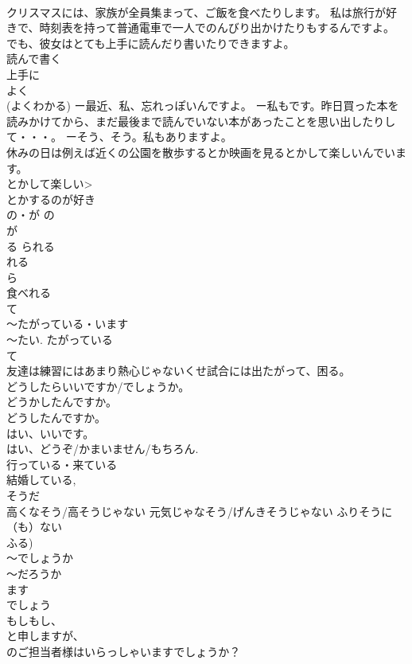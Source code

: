 \documentclass[8pt]{extreport}
\begin{document}
\begin{CJK}{UTF8}{min}
\\	クリスマスには、家族が全員集まって、ご飯を食べたりします。 私は旅行が好きで、時刻表を持って普通電車で一人でのんびり出かけたりもするんですよ。 でも、彼女はとても上手に読んだり書いたりできますよ。 
\\	読んで書く 
\\	上手に 
\\	よく 
\\	(よくわかる) ー最近、私、忘れっぽいんですよ。 ー私もです。昨日買った本を読みかけてから、まだ最後まで読んでいない本があったことを思い出したりして・・・。 ーそう、そう。私もありますよ。 
\\	休みの日は例えば近くの公園を散歩するとか映画を見るとかして楽しいんでいます。 
\\	とかして楽しい>
\\	とかするのが好き
\\	の・が	の 
\\	が 
\\	る	られる 
\\	れる 
\\	ら 
\\	食べれる
\\	て
\\	～たがっている・います	
\\	～たい. たがっている 
\\	て 
\\	友達は練習にはあまり熱心じゃないくせ試合には出たがって、困る。 
\\	どうしたらいいですか/でしょうか。	
\\	どうかしたんですか。 
\\	どうしたんですか。 
\\	はい、いいです。 
\\	はい、どうぞ/かまいません/もちろん.
\\	行っている・来ている	
\\	結婚している, 
\\	そうだ 
\\	高くなそう/高そうじゃない 元気じゃなそう/げんきそうじゃない ふりそうに（も）ない　
\\	ふる)
\\	～でしょうか 
\\	～だろうか 
\\	ます
\\	でしょう 
\\	もしもし、
\\	と申しますが、
\\	のご担当者様はいらっしゃいますでしょうか？ 

\end{CJK}
\end{document}
